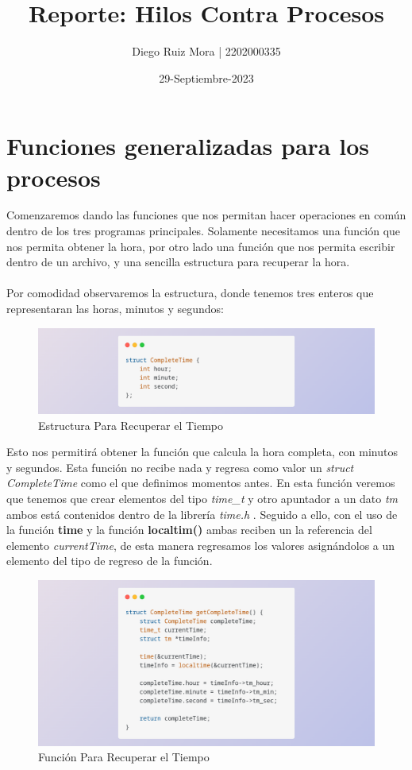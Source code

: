\documentclass[10pt]{article}
\title{\textbf{Reporte: Hilos Contra Procesos}}
\author{Diego Ruiz Mora | 2202000335}
\date{29-Septiembre-2023}
\begin{document}
	
	\maketitle
	\section{Funciones generalizadas para los procesos}
	Comenzaremos dando las funciones que nos permitan hacer operaciones en común dentro de los tres programas principales. Solamente necesitamos una función que nos permita obtener la hora, por otro lado una función que nos permita escribir dentro de un archivo, y una sencilla estructura para recuperar la hora. 
	\\\\
	Por comodidad observaremos la estructura, donde tenemos tres enteros que representaran las horas, minutos y segundos: 
	\begin{figure}[h!]
		\centering
		\includegraphics[width=\linewidth]{estructura.png}
		\caption{Estructura Para Recuperar el Tiempo}
		\label{fig:estructura}
	\end{figure}
	Esto nos permitirá obtener la función que calcula la hora completa, con minutos y segundos. Esta función no recibe nada y regresa como valor un \textit{struct CompleteTime} como el que definimos momentos antes.
	En esta función veremos que tenemos que crear elementos del tipo \textit{time\_t} y otro apuntador a un dato \textit{tm} ambos está contenidos dentro de la librería \emph{time.h} . Seguido a ello, con el uso de la función \textbf{time} y la función \textbf{localtim()} ambas reciben un la referencia del elemento \textit{currentTime}, de esta manera regresamos los valores asignándolos a un elemento del tipo de regreso de la función. 
	\begin{figure}[h!]
		\centering
		\includegraphics[width=\linewidth]{tiempo.png}
		\caption{Función Para Recuperar el Tiempo}
		\label{fig:tiempo}
	\end{figure}
\end{document}
